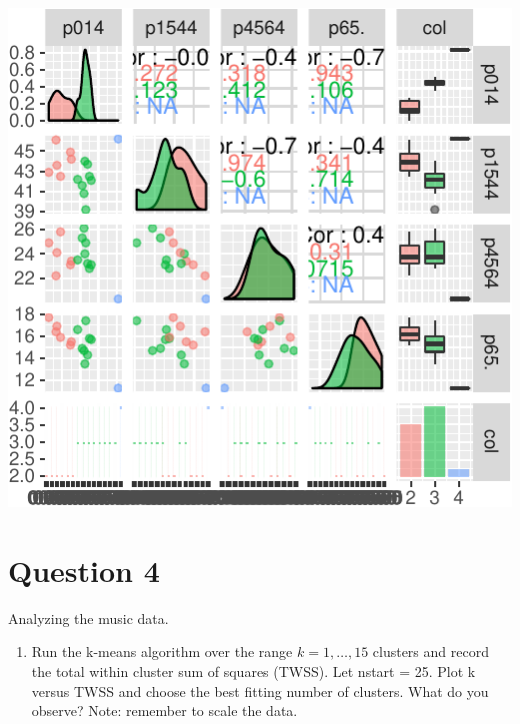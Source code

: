 \documentclass[]{article}
\providecommand{\tightlist}{%
  \setlength{\itemsep}{0pt}\setlength{\parskip}{0pt}}
\begin{document}
\begin{center}\includegraphics{sol_A1_files/figure-latex/unnamed-chunk-9-3} \end{center}

\newpage

\hypertarget{question-4}{%
\section{Question 4}\label{question-4}}

Analyzing the music data.

\begin{enumerate}
\def\labelenumi{\alph{enumi})}
\tightlist
\item
  Run the k-means algorithm over the range \(k = 1,\dots, 15\) clusters
  and record the total within cluster sum of squares (TWSS). Let nstart
  = 25. Plot k versus TWSS and choose the best fitting number of
  clusters. What do you observe? Note: remember to scale the data.
\end{enumerate}
\end{document}
